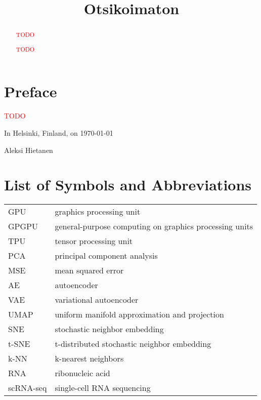 \begin{abstract}

\textcolor{red}{TODO}

\end{abstract}

\begin{otherlanguage}{finnish}

\title{Otsikoimaton}
\examiner{}
\keywords{}

\begin{abstract}

\textcolor{red}{TODO}

\end{abstract}
\end{otherlanguage}

\chapter*{Preface}

\textcolor{red}{TODO}

\vspace{2\baselineskip}

In Helsinki, Finland, on \today

\vspace{2\baselineskip}

Aleksi Hietanen

\tableofcontents
\listoffigures
\listoftables
\chapter*{List of Symbols and Abbreviations}


\begin{tabular}[h]{@{} p{} p{} @{}}
GPU & graphics processing unit \\
GPGPU & general-purpose computing on graphics processing units \\
TPU & tensor processing unit \\
PCA & principal component analysis \\
MSE & mean squared error \\
AE & autoencoder \\
VAE & variational autoencoder \\
UMAP & uniform manifold approximation and projection \\
SNE & stochastic neighbor embedding \\
t-SNE & t-distributed stochastic neighbor embedding \\
k-NN & k-nearest neighbors \\
RNA & ribonucleic acid \\
scRNA-seq & single-cell RNA sequencing
\end{tabular}

